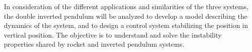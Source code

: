 In consideration of the different applications and similarities of the three systems, the double inverted pendulum will be analyzed to develop a model describing the dynamics of the system, and to design a control system stabilizing the position in vertical position. The objective is to understand and solve the instability properties shared by rocket and inverted pendulum systems.

